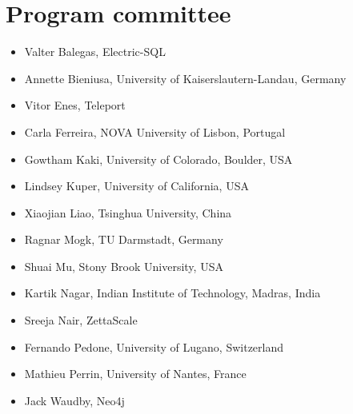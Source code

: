 \documentclass[sigplan,review,anonymous]{acmart}
\begin{document}
\section*{Program committee}

\begin{itemize}
\item Valter Balegas, Electric-SQL
\item Annette Bieniusa, University of Kaiserslautern-Landau, Germany
\item Vitor Enes, Teleport
\item Carla Ferreira, NOVA University of Lisbon, Portugal
\item Gowtham Kaki, University of Colorado, Boulder, USA
\item Lindsey Kuper, University of California, USA
\item Xiaojian Liao, Tsinghua University, China
\item Ragnar Mogk, TU Darmstadt, Germany
\item Shuai Mu, Stony Brook University, USA
\item Kartik Nagar, Indian Institute of Technology, Madras, India
\item Sreeja Nair, ZettaScale
\item Fernando Pedone, University of Lugano, Switzerland
\item Mathieu Perrin, University of Nantes, France
\item Jack Waudby, Neo4j
\end{itemize}


\end{document}
